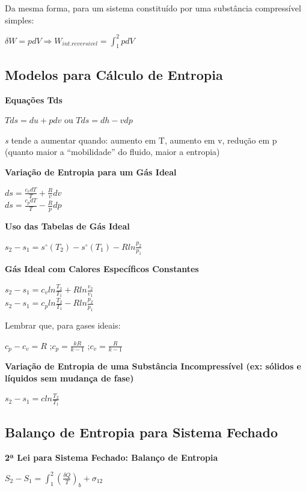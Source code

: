 \documentclass[a4paper, 12pt]{article}
\begin{document}
Da mesma forma, para um sistema constituído por uma substância
compressível simples:
	\begin{center}
		\large
		$ \delta W = pdV \Rightarrow 
		W_{int.reversivel} = \int^2_1 pdV $
	\end{center}

\subsection{Modelos para Cálculo de Entropia}
\textbf{Equações Tds}
	\begin{center}
		\large
		$ Tds = du + pdv $ ou
		$ Tds = dh  - vdp $
	\end{center}

\textit{s} tende a aumentar quando: aumento em T, aumento em v, redução em p
(quanto maior a “mobilidade” do fluido, maior a entropia)

\textbf{Variação de Entropia para um Gás Ideal}
	\begin{center}
		\large
		$ ds = \frac{c_vdT}{T} + \frac{R}{v}dv $\\
		$ ds = \frac{c_pdT}{T} - \frac{R}{p}dp$
	\end{center}

\textbf{Uso das Tabelas de Gás Ideal}
	\begin{center}
		\large
		$ s_2 - s_1 = s^\circ(T_2) - s^\circ(T_1) - Rln\frac{p_2}{p_1}$
	\end{center}

\textbf{Gás Ideal com Calores Específicos Constantes}
	\begin{center}
		\large
		$ s_2 - s_1 = c_vln\frac{T_2}{T_1} + Rln\frac{v_2}{v_1} $\\
		$ s_2 - s_1 = c_pln\frac{T_2}{T_1} - Rln\frac{p_2}{p_1} $
	\end{center}

Lembrar que, para gases ideais:
	\begin{center}
		\large
		$ c_p - c_v = R $ ;$ c_p = \frac{kR}{k - 1} $ ;$ c_v = \frac{R}{k - 1} $
	\end{center}

\textbf{Variação de Entropia de uma Substância Incompressível (ex: sólidos e líquidos sem mudança de fase)}
	\begin{center}
		\large
		$ s_2 - s_1 = cln\frac{T_2}{T_1} $
	\end{center}

\subsection{Balanço de Entropia para Sistema Fechado}
\textbf{2ª Lei para Sistema Fechado: Balanço de Entropia}
	\begin{center}
		\large
		$ S_2 - S_1 = \int^2_1(\frac{\delta Q}{T})_b + \sigma_{12} $
	\end{center}
\end{document}
